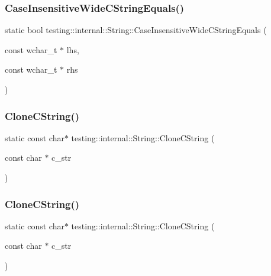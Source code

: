 \subsubsection{\texorpdfstring{CaseInsensitiveWideCStringEquals()}{CaseInsensitiveWideCStringEquals()}\hspace{0.1cm}{\footnotesize\ttfamily [3/3]}}
{\footnotesize\ttfamily static bool testing\+::internal\+::\+String\+::\+Case\+Insensitive\+Wide\+C\+String\+Equals (\begin{DoxyParamCaption}\item[{const wchar\+\_\+t $\ast$}]{lhs,  }\item[{const wchar\+\_\+t $\ast$}]{rhs }\end{DoxyParamCaption})\hspace{0.3cm}{\ttfamily [static]}}

\mbox{\label{classtesting_1_1internal_1_1_string_a8bce6b1281ae3d2f9061b920aa78aca0}} 
\subsubsection{\texorpdfstring{CloneCString()}{CloneCString()}\hspace{0.1cm}{\footnotesize\ttfamily [1/3]}}
{\footnotesize\ttfamily static const char$\ast$ testing\+::internal\+::\+String\+::\+Clone\+C\+String (\begin{DoxyParamCaption}\item[{const char $\ast$}]{c\+\_\+str }\end{DoxyParamCaption})\hspace{0.3cm}{\ttfamily [static]}}

\mbox{\label{classtesting_1_1internal_1_1_string_a8bce6b1281ae3d2f9061b920aa78aca0}} 
\subsubsection{\texorpdfstring{CloneCString()}{CloneCString()}\hspace{0.1cm}{\footnotesize\ttfamily [2/3]}}
{\footnotesize\ttfamily static const char$\ast$ testing\+::internal\+::\+String\+::\+Clone\+C\+String (\begin{DoxyParamCaption}\item[{const char $\ast$}]{c\+\_\+str }\end{DoxyParamCaption})\hspace{0.3cm}{\ttfamily [static]}}

